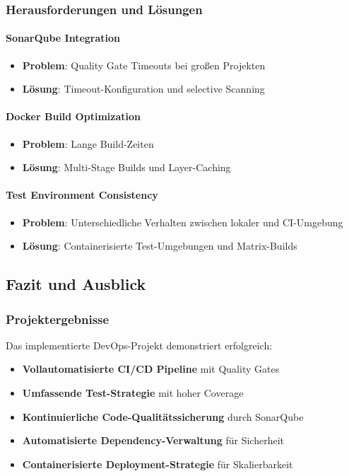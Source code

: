 \subsubsection{Herausforderungen und Lösungen}
\paragraph{SonarQube Integration}
\begin{itemize}
    \item \textbf{Problem}: Quality Gate Timeouts bei großen Projekten
    \item \textbf{Lösung}: Timeout-Konfiguration und selective Scanning
\end{itemize}

\paragraph{Docker Build Optimization}
\begin{itemize}
    \item \textbf{Problem}: Lange Build-Zeiten
    \item \textbf{Lösung}: Multi-Stage Builds und Layer-Caching
\end{itemize}

\paragraph{Test Environment Consistency}
\begin{itemize}
    \item \textbf{Problem}: Unterschiedliche Verhalten zwischen lokaler und CI-Umgebung
    \item \textbf{Lösung}: Containerisierte Test-Umgebungen und Matrix-Builds
\end{itemize}

\subsection{Fazit und Ausblick}

\subsubsection{Projektergebnisse}
Das implementierte DevOps-Projekt demonstriert erfolgreich:
\begin{itemize}
    \item \textbf{Vollautomatisierte CI/CD Pipeline} mit Quality Gates
    \item \textbf{Umfassende Test-Strategie} mit hoher Coverage
    \item \textbf{Kontinuierliche Code-Qualitätssicherung} durch SonarQube
    \item \textbf{Automatisierte Dependency-Verwaltung} für Sicherheit
    \item \textbf{Containerisierte Deployment-Strategie} für Skalierbarkeit
\end{itemize}